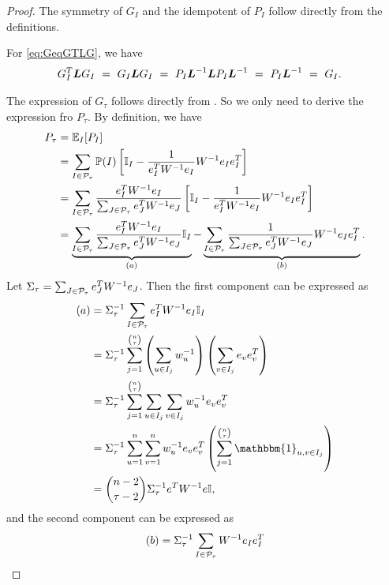 \begin{proof}
    The symmetry of $G_{I}$ and the idempotent of $P_{I}$ follow directly from the definitions. 
    
    For \autoref{eq:GeqGTLG}, we have
    \begin{align*}
        G_{I}^T \boldsymbol{L} G_{I} &~=~ G_{I} \boldsymbol{L} G_{I} ~=~ P_{I} \boldsymbol{L}^{-1} \boldsymbol{L} P_{I} \boldsymbol{L}^{-1} ~=~ P_{I} \boldsymbol{L}^{-1} ~=~ G_{I}.
    \end{align*}

    The expression of $G_\tau$ follows directly from \cite[Theorem~3.3]{necoara2017random}. So we only need to derive the expression fro $P_\tau$. By definition, we have 
    \begin{align*}
        P_\tau &= \mathbb{E}_I[P_I]\\
        &= \sum_{I \in \mathcal{P}_\tau} \mathbb{P}(I) \left[ \mathbb{I}_I - \frac{1}{e_I^TW^{-1}e_I}W^{-1}e_Ie_I^T \right]\\
        &= \sum_{I \in \mathcal{P}_\tau} \frac{e_I^TW^{-1}e_I}{\sum_{J \in \mathcal{P}_\tau} e_J^TW^{-1}e_J} \left[ \mathbb{I}_I - \frac{1}{e_I^TW^{-1}e_I}W^{-1}e_Ie_I^T \right]\\
        &= \underbrace{\sum_{I \in \mathcal{P}_\tau} \frac{e_I^TW^{-1}e_I}{\sum_{J \in \mathcal{P}_\tau} e_J^TW^{-1}e_J} \mathbb{I}_I}_{(a)} - \underbrace{\sum_{I \in \mathcal{P}_\tau} \frac{1}{\sum_{J \in \mathcal{P}_\tau} e_J^TW^{-1}e_J}W^{-1}e_Ie_I^T}_{(b)}.
    \end{align*}
    Let $\Sigma_\tau = \sum_{J \in \mathcal{P}_\tau} e_J^TW^{-1}e_J$. Then the first component can be expressed as 
    \begin{align*}
        (a) &= \Sigma_\tau^{-1} \sum_{I \in \Pscr_\tau} e_I^TW^{-1}e_I \mathbb{I}_I\\
        &= \Sigma_\tau^{-1} \sum_{j=1}^{\binom{n}{\tau}} \left(\sum_{u \in I_j}w_u^{-1}\right)\left(\sum_{v \in I_j}e_ve_v^T\right)\\
        &= \Sigma_\tau^{-1} \sum_{j=1}^{\binom{n}{\tau}} \sum_{u \in I_j} \sum_{v \in I_j} w_u^{-1} e_ve_v^T \\
        &= \Sigma_\tau^{-1} \sum_{u=1}^n \sum_{v=1}^n w_u^{-1} e_ve_v^T \left(\sum_{j=1}^{\binom{n}{\tau}} \mathbbm{1}_{u,v \in I_j} \right)\\
        &= \binom{n-2}{\tau-2}\Sigma_\tau^{-1}e^TW^{-1}e \mathbb{I},
    \end{align*}
    and the second component can be expressed as 
    \begin{align*}
        (b) &= \Sigma_\tau^{-1} \sum_{I \in \Pscr_\tau} W^{-1}e_Ie_I^T\\

\end{align*}
\end{proof}
